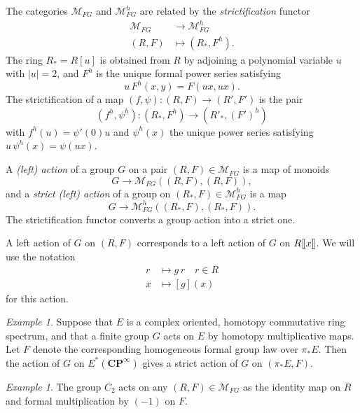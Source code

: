 \documentclass{amsart}
\theoremstyle{definition}
\theoremstyle{remark}
\newtheorem{eg}[equation]{Example}
\newcommand{\LL}{[\mkern-2mu[}
\newcommand{\RR}{]\mkern-2mu]}
\newcommand{\cp}{\mathbf{CP}}
\newcommand{\zt}{C_{2}}
\newcommand{\mfg}{\mathcal{M}_{FG}}
\newcommand{\mfgh}{\mathcal{M}_{FG}^{h}}
\begin{document}
The categories $\mfg$ and $\mfgh$ are related by the {\em
strictification} functor
\begin{align*}
\mfg & \to\mfgh \\
(R,F) &\mapsto (R_{\ast},F^{h}).
\end{align*}
The ring $R_{\ast}=R[u]$ is obtained from $R$ by adjoining a
polynomial variable $u$ with $|u|=2$,  and $F^{h}$ is the unique
formal power series satisfying
\begin{equation}
\label{eq:160}
u\, F^{h}(x,y) = F(u x, u x).
\end{equation}
The strictification of a map $(f,\psi):(R,F)\to (R',F')$ is the pair
\[
(f^{h}, \psi^{h}):(R_{\ast},F^{h})\to (R'_{\ast}, (F')^{h})
\]
with $f^{h}(u)= \psi'(0)u$ and $\psi^{h}(x)$ the unique power series
satisfying $u\, \psi^{h}(x) = \psi(u x)$.  

A {\em (left) action} of a group $G$ on a pair $(R,F)\in\mfg$ is a
map of monoids
\[
G\to \mfg((R,F), (R,F)),
\]
and a {\em strict (left) action} of a group on $(R_{\ast},F)\in\mfgh$ is
a map
\[
G\to \mfgh((R_{\ast},F),(R_{\ast},F)).
\]
The strictification functor converts a group action into a strict one.

A left action of $G$ on $(R,F)$ corresponds to a left action of $G$ on
$R\LL x\RR$.  We will use the notation
\begin{align*}
r &\mapsto g\,r \quad r\in R \\
x & \mapsto [g](x)
\end{align*}
for this action. 

\begin{eg}
\label{eg:12} Suppose that $E$ is a complex oriented, homotopy
commutative ring spectrum, and that a finite group $G$ acts on $E$ by
homotopy multiplicative maps.  Let $F$ denote the corresponding
homogeneous formal group law over $\pi_{\ast}E$.  Then the action of
$G$ on $E^{\ast}(\cp^{\infty})$ gives a strict action of $G$ on
$(\pi_{\ast}E,F)$.
\end{eg}

\begin{eg}
\label{eg:21} The group $\zt$ acts on any $(R,F)\in\mfg$ as the
identity map on $R$ and formal multiplication by $(-1)$ on $F$.
\end{eg}
\end{document}
